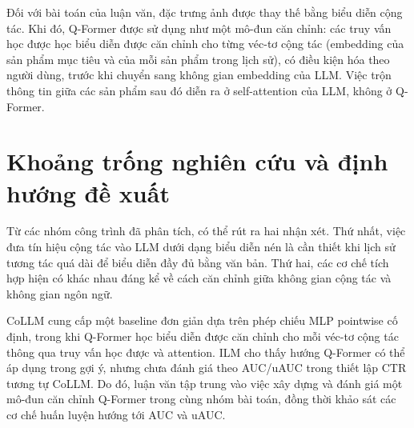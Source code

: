 Đối với bài toán của luận văn, đặc trưng ảnh được thay thế bằng biểu diễn cộng tác. Khi đó,
Q-Former được sử dụng như một mô-đun căn chỉnh: các truy vấn học được học biểu diễn được
căn chỉnh cho từng véc-tơ cộng tác (embedding của sản phẩm mục tiêu và của mỗi sản phẩm trong
lịch sử), có điều kiện hóa theo người dùng, trước khi chuyển sang không gian embedding của LLM.
Việc trộn thông tin giữa các sản phẩm sau đó diễn ra ở self-attention của LLM, không ở Q-Former.

\section{Khoảng trống nghiên cứu và định hướng đề xuất}
\label{sec:tong-ket-ch2}

Từ các nhóm công trình đã phân tích, có thể rút ra hai nhận xét. Thứ nhất, việc đưa tín hiệu
cộng tác vào LLM dưới dạng biểu diễn nén là cần thiết khi lịch sử tương tác quá dài để biểu
diễn đầy đủ bằng văn bản. Thứ hai, các cơ chế tích hợp hiện có khác nhau đáng kể về cách căn
chỉnh giữa không gian cộng tác và không gian ngôn ngữ.

CoLLM cung cấp một baseline đơn giản dựa trên phép chiếu MLP pointwise cố định, trong khi
Q-Former học biểu diễn được căn chỉnh cho mỗi véc-tơ cộng tác thông qua truy vấn học được và attention.
ILM cho thấy hướng Q-Former có thể áp dụng trong gợi ý, nhưng chưa đánh giá theo AUC/uAUC
trong thiết lập CTR tương tự CoLLM. Do đó, luận văn tập trung vào việc xây dựng và đánh giá
một mô-đun căn chỉnh Q-Former trong cùng nhóm bài toán, đồng thời khảo sát các cơ chế huấn
luyện hướng tới AUC và uAUC.
